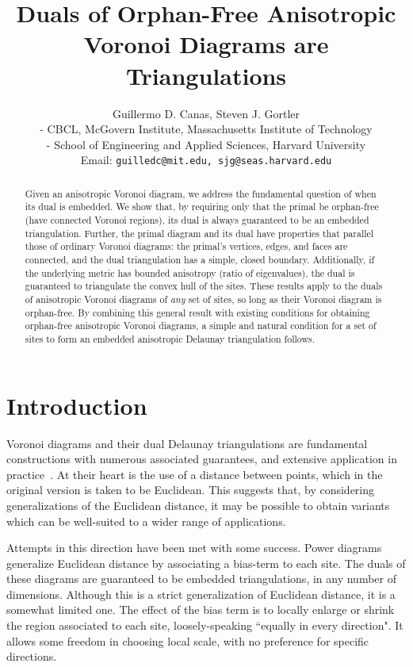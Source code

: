 \documentclass[11pt]{article}
\title{Duals of Orphan-Free Anisotropic Voronoi Diagrams are Triangulations}
\author{Guillermo D. Canas,   Steven J. Gortler \\
\small   - CBCL, McGovern Institute,  
Massachusetts Institute of Technology\\
\small   - School of Engineering and Applied Sciences, 
Harvard University\\
\small Email:  \tt guilledc@mit.edu, sjg@seas.harvard.edu}
\date{}
\begin{document}
\maketitle

\begin{abstract}
Given an anisotropic Voronoi diagram, we address the fundamental question of when its dual is embedded. 
We show that, by requiring only that the primal be orphan-free (have connected Voronoi regions), 
its dual is always guaranteed to be an embedded triangulation. 
Further, the primal  diagram and its dual have properties that parallel those of ordinary Voronoi diagrams:
the primal's vertices, edges, and faces are connected, and the dual triangulation has a simple, closed boundary. 
Additionally, if the underlying metric has bounded anisotropy (ratio of eigenvalues), the dual is guaranteed to triangulate the convex hull of the sites.   
These results apply to the duals of anisotropic Voronoi diagrams of \emph{any}
set of sites, so long as their Voronoi diagram is orphan-free. 
By combining this general result with existing conditions for obtaining orphan-free anisotropic Voronoi diagrams, 
a simple and natural condition for a set of sites to form an embedded anisotropic Delaunay triangulation follows. 
\end{abstract}

\newpage

\section{Introduction}

Voronoi diagrams and their dual Delaunay triangulations are fundamental constructions with
numerous associated guarantees, and extensive application in
practice~\cite{Delaunay1934,Edelsbrunner}. 
At their heart is the use of a distance between points, which in the original
version is taken to be Euclidean. 
This suggests that, by considering generalizations of the Euclidean
distance, it may be possible to obtain variants which can be well-suited to
a wider range of applications.  

Attempts in this direction have been met with some success. 
Power diagrams~\cite{power} generalize Euclidean distance by associating a {bias-term} to each site. The duals of these diagrams
are guaranteed to be embedded triangulations, in any number of
dimensions. 
Although this is a strict generalization of Euclidean distance, it is a somewhat 
limited one. The effect of the bias term is to locally enlarge or shrink the
region associated to each site, loosely-speaking ``equally in every
direction". It allows some freedom in choosing local scale, with no
preference for specific directions. 
\end{document}

